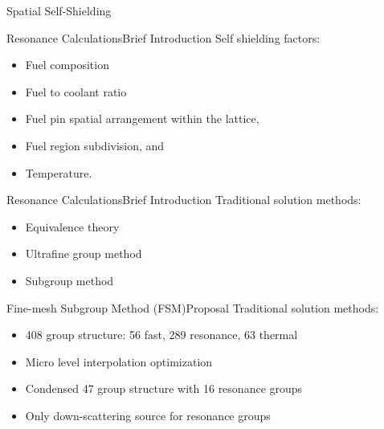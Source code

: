 \documentclass[sans,mathserif,aspectratio=169]{beamer}
\begin{document}
\begin{frame}{Spatial Self-Shielding}
  \centering
\end{frame}

\begin{frame}{Resonance Calculations}{Brief Introduction}
Self shielding factors:
\begin{itemize}[<+->]
	\item Fuel composition
	\item Fuel to coolant ratio
	\item Fuel pin spatial arrangement within the lattice,
  \item Fuel region subdivision, and
  \item Temperature.
\end{itemize}
\end{frame}

\begin{frame}{Resonance Calculations}{Brief Introduction}
Traditional solution methods:
\begin{itemize}[<+->]
	\item Equivalence theory
	\item Ultrafine group method
	\item Subgroup method
\end{itemize}
\end{frame}

\begin{frame}{Fine-mesh Subgroup Method (FSM)}{Proposal}
Traditional solution methods:
\begin{itemize}[<+->]
	\item 408 group structure: 56 fast, 289 resonance, 63 thermal
	\item Micro level interpolation optimization
	\item Condensed 47 group structure with 16 resonance groups
	\item Only down-scattering source for resonance groups
\end{itemize}
\end{frame}
\end{document}
